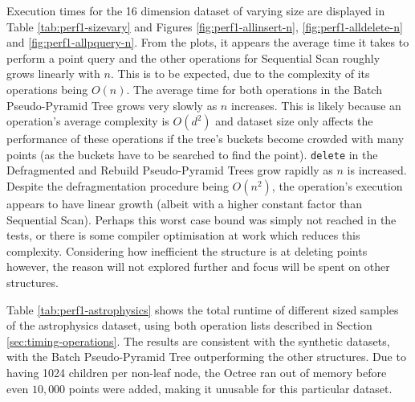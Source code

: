 Execution times for the 16 dimension dataset of varying size are displayed in Table \ref{tab:perf1-sizevary} and Figures \ref{fig:perf1-allinsert-n}, \ref{fig:perf1-alldelete-n} and \ref{fig:perf1-allpquery-n}. From the plots, it appears the average time it takes to perform a point query and the other operations for Sequential Scan roughly grows linearly with $n$. This is to be expected, due to the complexity of its operations being $O(n)$. The average time for both operations in the Batch Pseudo-Pyramid Tree grows very slowly as $n$ increases. This is likely because an operation's average complexity is $O(d^2)$ and dataset size only affects the performance of these operations if the tree's buckets become crowded with many points (as the buckets have to be searched to find the point). \texttt{delete} in the Defragmented and Rebuild Pseudo-Pyramid Trees grow rapidly as $n$ is increased. Despite the defragmentation procedure being $O(n^2)$, the operation's execution appears to have linear growth (albeit with a higher constant factor than Sequential Scan). Perhaps this worst case bound was simply not reached in the tests, or there is some compiler optimisation at work which reduces this complexity. Considering how inefficient the structure is at deleting points however, the reason will not explored further and focus will be spent on other structures.

Table \ref{tab:perf1-astrophysics} shows the total runtime of different sized samples of the astrophysics dataset, using both operation lists described in Section \ref{sec:timing-operations}. The results are consistent with the synthetic datasets, with the Batch Pseudo-Pyramid Tree outperforming the other structures. Due to having 1024 children per non-leaf node, the Octree ran out of memory before even $10,000$ points were added, making it unusable for this particular dataset.

